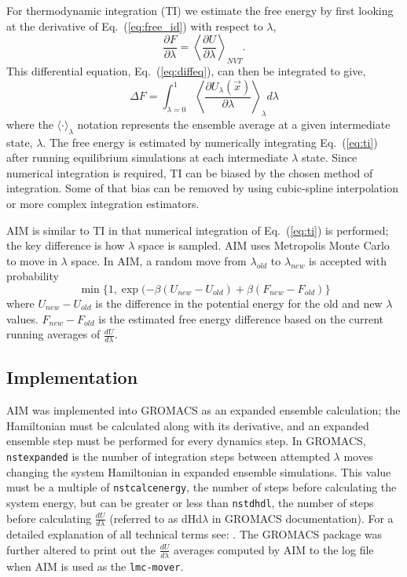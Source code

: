 \documentclass[fleqn,10pt,lineno]{wlpeerj} %
\begin{document}
For thermodynamic integration (TI) we estimate the free energy by first looking at the derivative of Eq.\ (\ref{eq:free_id}) with respect to $\lambda$,
\begin{equation}\label{eq:diffeq}
    \frac{\partial F}{\partial \lambda} = \left< \frac{\partial U}{\partial \lambda} \right>_{NVT}.
\end{equation}
This differential equation, Eq.\ (\ref{eq:diffeq}), can then be integrated to give,
\begin{equation}\label{eq:ti}
    \Delta F = \int_{\lambda = 0}^{1} \left< \frac{\partial U_{\lambda}(\vec{x})}{\partial \lambda} \right>_{\lambda} d\lambda
\end{equation}
where the $\langle \cdot \rangle_{\lambda}$ notation represents the ensemble average at a given intermediate state, $\lambda$. The free energy is estimated by numerically integrating Eq.\ (\ref{eq:ti}) after running equilibrium simulations at each intermediate $\lambda$ state. Since numerical integration is required, TI can be biased by the chosen method of integration. Some of that bias can be removed by using cubic-spline interpolation or more complex integration estimators\citep{Shirts2005, Shyu2009}.

AIM is similar to TI in that numerical integration of Eq.\ (\ref{eq:ti}) is performed; the key difference is how $\lambda$ space is sampled. AIM uses Metropolis Monte Carlo to move in $\lambda$ space. In AIM, a random move from $\lambda_{old}$ to $\lambda_{new}$ is accepted with probability
\begin{equation}\label{eq:aimaccept}
\min\{1,\exp(- \beta( U_{new} - U_{old})+\beta(F_{new} - F_{old})\}
\end{equation}
where $U_{new} - U_{old}$ is the difference in the potential energy for the old and new $\lambda$ values. $F_{new} - F_{old}$ is the estimated free energy difference based on the current running averages of $\frac{dU}{d\lambda}$.

\subsection*{Implementation} \label{implementation}

AIM was implemented into GROMACS as an expanded ensemble calculation; the Hamiltonian must be calculated along with its derivative, and an expanded ensemble step must be performed for every dynamics step. In GROMACS, \texttt{nstexpanded} is the number of integration steps between attempted $\lambda$ moves changing the system Hamiltonian in expanded ensemble simulations. This value must be a multiple of \texttt{nstcalcenergy}, the number of steps before calculating the system energy, but can be greater or less than \texttt{nstdhdl}, the number of steps before calculating $\frac{dU}{d\lambda}$ (referred to as dHd$\lambda$ in GROMACS documentation). For a detailed explanation of all technical terms see: \cite{gmxmanual}. The GROMACS package was further altered to print out the $\frac{dU}{d\lambda}$ averages computed by AIM to the log file when AIM is used as the \texttt{lmc-mover}.
\end{document}
